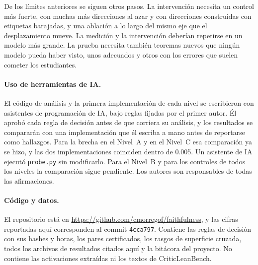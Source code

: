 \documentclass[10pt]{article}
\newcommand{\vr}[1]{\texttt{#1}}
\begin{document}
De los límites anteriores se siguen otros pasos. La intervención necesita un control más fuerte, con muchas más
direcciones al azar y con direcciones construidas con etiquetas barajadas, y una ablación a lo largo del mismo eje que
el desplazamiento mueve. La medición y la intervención deberían repetirse en un modelo más grande. La prueba necesita
también teoremas nuevos que ningún modelo pueda haber visto, unos adecuados y otros con los errores que suelen cometer
los estudiantes.

\paragraph{Uso de herramientas de IA.}
El código de análisis y la primera implementación de cada nivel se escribieron con asistentes de programación de IA,
bajo reglas fijadas por el primer autor. Él aprobó cada regla de decisión antes de que corriera su análisis, y los
resultados se compararán con una implementación que él escriba a mano antes de reportarse como hallazgos. Para la
brecha en el Nivel~A y en el Nivel~C esa comparación ya se hizo, y las dos implementaciones coinciden dentro de 0.005.
Un asistente de IA ejecutó \vr{probe.py} sin modificarlo. Para el Nivel~B y para los controles de todos los niveles
la comparación sigue pendiente. Los autores son responsables de todas las afirmaciones.

\paragraph{Código y datos.}
El repositorio está en \url{https://github.com/cmorregof/faithfulness}, y las cifras reportadas aquí corresponden
al commit \vr{4cca797}. Contiene las reglas de decisión con sus hashes y horas, los pares certificados, los
rasgos de superficie cruzada, todos los archivos de resultados citados aquí y la bitácora del proyecto. No
contiene las activaciones extraídas ni los textos de CriticLeanBench.





\appendix
\end{document}
